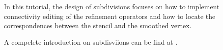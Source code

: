 
In this tutorial, the design of subdivisions focuses on how
to implement connectivity editing of the refinement operators
and how to locate the correspondences between the stencil and the
smoothed vertex.
  
A compelete introduction on subdisviions can be find at 
\cite{siggraph1998notes}.
